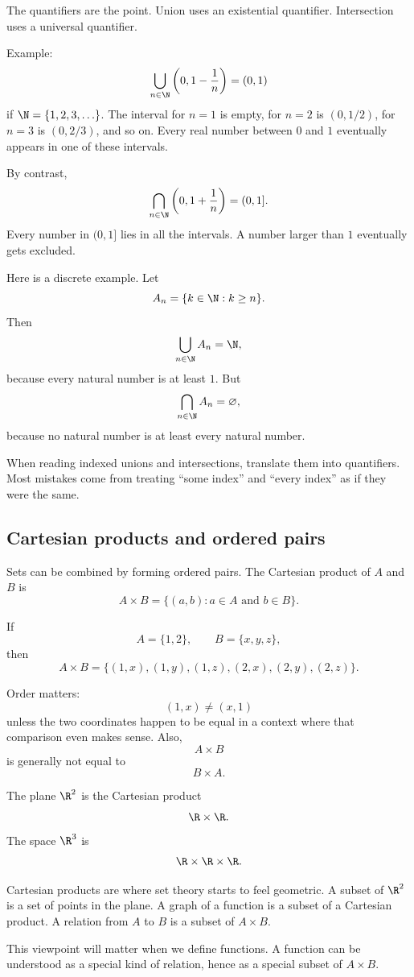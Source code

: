 The quantifiers are the point. Union uses an existential quantifier. Intersection uses a universal quantifier.

Example:
\[
\bigcup_{n\in\N}\left(0,1-\frac1n\right)=(0,1)
\]
if $\N=\{1,2,3,\ldots\}$. The interval for $n=1$ is empty, for $n=2$ is $(0,1/2)$, for $n=3$ is $(0,2/3)$, and so on. Every real number between $0$ and $1$ eventually appears in one of these intervals.

By contrast,
\[
\bigcap_{n\in\N}\left(0,1+\frac1n\right)=(0,1].
\]
Every number in $(0,1]$ lies in all the intervals. A number larger than $1$ eventually gets excluded.

Here is a discrete example. Let
\[
A_n=\{k\in\N:k\geq n\}.
\]
Then
\[
\bigcup_{n\in\N}A_n=\N,
\]
because every natural number is at least $1$. But
\[
\bigcap_{n\in\N}A_n=\varnothing,
\]
because no natural number is at least every natural number.

\begin{trapbox}
When reading indexed unions and intersections, translate them into quantifiers. Most mistakes come from treating ``some index'' and ``every index'' as if they were the same.
\end{trapbox}

\subsection{Cartesian products and ordered pairs}

Sets can be combined by forming ordered pairs. The Cartesian product of $A$ and $B$ is
\[
A\times B=\{(a,b):a\in A\text{ and }b\in B\}.
\]

If
\[
A=\{1,2\},\qquad B=\{x,y,z\},
\]
then
\[
A\times B=\{(1,x),(1,y),(1,z),(2,x),(2,y),(2,z)\}.
\]

Order matters:
\[
(1,x)\neq(x,1)
\]
unless the two coordinates happen to be equal in a context where that comparison even makes sense. Also,
\[
A\times B
\]
is generally not equal to
\[
B\times A.
\]

The plane $\R^2$ is the Cartesian product
\[
\R\times\R.
\]
The space $\R^3$ is
\[
\R\times\R\times\R.
\]

Cartesian products are where set theory starts to feel geometric. A subset of $\R^2$ is a set of points in the plane. A graph of a function is a subset of a Cartesian product. A relation from $A$ to $B$ is a subset of $A\times B$.

This viewpoint will matter when we define functions. A function can be understood as a special kind of relation, hence as a special subset of $A\times B$.

